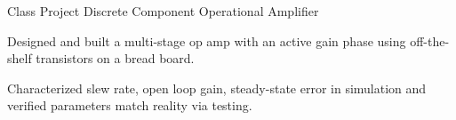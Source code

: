   \begin{cventry}
    {Class Project} %
    {Discrete Component Operational Amplifier} %
    {} %
    {} %
    {
      \begin{cvitems} %
        \item {
        Designed and built a multi-stage op amp with an active gain phase using off-the-shelf transistors on a bread
          board.
        }
        \item {
        Characterized slew rate, open loop gain, steady-state error in simulation and verified parameters match reality via testing.
        }
      \end{cvitems}
    }
  \end{cventry}
